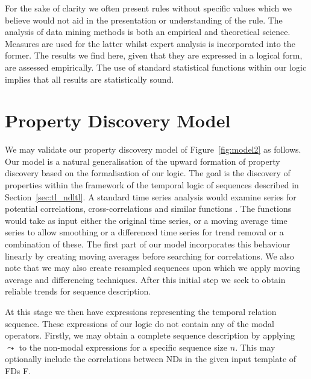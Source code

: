 \medskip

For the sake of clarity we often present rules without specific values
which we believe would not aid in the presentation or understanding of
the rule. The analysis of data mining methods is both an empirical and
theoretical science. Measures are used for the latter whilst expert
analysis is incorporated into the former. The results we find here,
given that they are expressed in a logical form, are assessed
empirically. The use of standard statistical functions within our
logic implies that all results are statistically
sound. 

\section{Property Discovery Model}\label{sec:tr_propmodel}

We may validate our property discovery model of
Figure~\ref{fig:model2} as follows. Our model is a natural
generalisation of the upward formation of property discovery based on
the formalisation of our logic. The goal is the discovery of
properties within the framework of the temporal logic of sequences
described in Section~\ref{sec:tl_ndltl}. A standard time series
analysis would examine series for potential correlations,
cross-correlations and similar functions \cite{ko90}. The functions
would take as 
input either the original time series, or a moving average time series
to allow smoothing or a differenced time series for trend removal or a
combination of these. The first part of our model 
incorporates this behaviour linearly by creating moving averages before
searching for correlations. We also note that
we may also create resampled sequences upon which we apply moving
average and differencing techniques. After this initial step we seek
to obtain reliable trends for sequence description.

\medskip

At this stage we then have expressions representing the temporal
relation sequence. These expressions of
our logic do not contain any of the modal operators. Firstly, we may
obtain a complete sequence description by applying $\leadsto$ to the
non-modal expressions for a specific sequence size $n$. This may
optionally include the correlations between NDs in the given input
template of FDs F. 

\medskip

